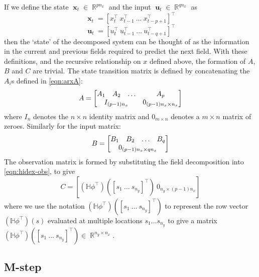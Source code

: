 \documentclass{IEEEtran}
\DeclareMathOperator{\R}{\mathbb{R}}
\DeclareMathOperator{\xvec}{\mathbf{x}}
\DeclareMathOperator{\uvec}{\mathbf{u}}
\begin{document}
If we define the state $\xvec_t \in \R^{pn_x}$ and the input $\uvec_t \in \R^{qn_x}$ as 
\begin{equation}
	\xvec_t = [x_t^\top ~ x_{t-1}^\top ~ \ldots ~ x_{t-p+1}^\top]^\top
\end{equation}
\begin{equation}
	\uvec_t = [u_t^\top ~ u_{t-1}^\top ~ \ldots ~ u_{t-q+1}^\top]^\top
\end{equation}
then the `state' of the decomposed system can be thought of as the information in the current and previous fields required to predict the next field. With these definitions, and the recursive relationship on $x$ defined above, the formation of $A$, $B$ and $C$ are trivial. The state transition matrix is defined by concatenating the $A_i$s defined in \ref{eqn:arxA}:
\begin{equation}
	A = \begin{bmatrix}
	A_1 & A_2 & \ldots & A_p \\
	\multicolumn{3}{c}{I_{(p-1)n_x}} & 0_{(p-1)n_x \times n_x}
	\end{bmatrix}
\end{equation}
where $I_n$ denotes the $n\times n$ identity matrix and $0_{m\times n}$ denotes a $m\times n$ matrix of zeroes. Similarly for the input matrix:
\begin{equation}
	B = \begin{bmatrix}
	B_1 & B_2 & \ldots & B_q \\
	\multicolumn{4}{c}{0_{(p-1)n_x\times qn_x}}
	\end{bmatrix}
\end{equation}
The observation matrix is formed by substituting the field decomposition into \ref{eqn:hidex-obs}, to give
\begin{equation}
	C = [(\mathbb{H}\phi^\top)([s_1 ~ \ldots ~ s_{n_y}]^\top) ~ 0_{n_y \times (p-1)n_x}]
\end{equation}
where we use the notation $(\mathbb{H}\phi^\top)([s_1 ~  \ldots ~ s_{n_y}]^\top)$ to represent the row vector $(\mathbb{H}\phi^\top)(s)$ evaluated at multiple locations $s_1 \ldots s_{n_y}$ to give a matrix $(\mathbb{H}\phi^\top)([s_1 ~  \ldots ~ s_{n_y}]^\top) \in \R^{n_y \times n_x}$.


\subsection{M-step}
\end{document}
